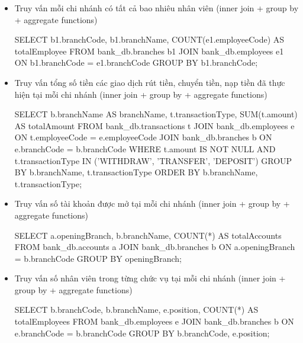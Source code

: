 \begin{itemize}

     \item Truy vấn mỗi chi nhánh có tất cả bao nhiêu nhân viên (inner join + group by + aggregate functions)
    \begin{MySQLCode}
    SELECT 
        b1.branchCode,
        b1.branchName,
        COUNT(e1.employeeCode) AS totalEmployee
    FROM 
        bank_db.branches b1
    JOIN 
        bank_db.employees e1 ON b1.branchCode = e1.branchCode
    GROUP BY 
        b1.branchCode;
    \end{MySQLCode}

    \item Truy vấn tổng số tiền các giao dịch rút tiền, chuyển tiền, nạp tiền đã thực hiện tại mỗi chi nhánh (inner join + group by + aggregate functions)
    \begin{MySQLCode}
    SELECT 
        b.branchName AS branchName,
        t.transactionType,
        SUM(t.amount) AS totalAmount
    FROM 
        bank_db.transactions t
    JOIN 
        bank_db.employees e ON t.employeeCode = e.employeeCode
    JOIN 
        bank_db.branches b ON e.branchCode = b.branchCode
    WHERE 
        t.amount IS NOT NULL
        AND t.transactionType IN ('WITHDRAW', 'TRANSFER', 'DEPOSIT')
    GROUP BY 
        b.branchName, t.transactionType
    ORDER BY 
        b.branchName, t.transactionType;
    \end{MySQLCode}

    \item Truy vấn số tài khoản được mở tại mỗi chi nhánh (inner join + group by + aggregate functions)
    \begin{MySQLCode}
    SELECT 
	   a.openingBranch, 
        b.branchName,
        COUNT(*) AS totalAccounts
    FROM 
	   bank_db.accounts a
    JOIN
	   bank_db.branches b ON a.openingBranch = b.branchCode
    GROUP BY
	   openingBranch;
    \end{MySQLCode}

    \item Truy vấn số nhân viên trong từng chức vụ tại mỗi chi nhánh (inner join + group by + aggregate functions)
    \begin{MySQLCode}
    SELECT 
	   b.branchCode,
        b.branchName,
        e.position,
        COUNT(*) AS totalEmployees
    FROM 
        bank_db.employees e
    JOIN 
        bank_db.branches b ON e.branchCode = b.branchCode
    GROUP BY 
        b.branchCode, e.position;
    \end{MySQLCode}


\end{itemize}
